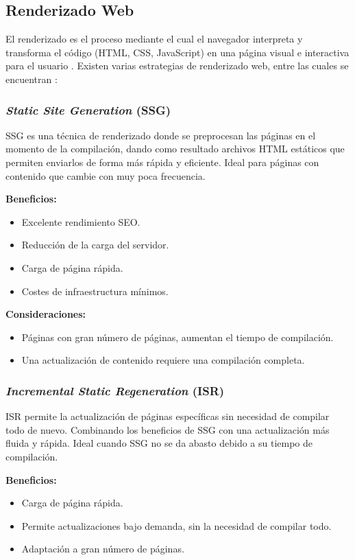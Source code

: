\subsection{Renderizado Web}
El \gls{renderizado} es el proceso mediante el cual el navegador interpreta y transforma el código (HTML, CSS, JavaScript) 
en una página visual e interactiva para el usuario \cite{vercel2024renderingStrategy}.
Existen varias estrategias de renderizado web, entre las cuales se encuentran :

\subsubsection{\textit{Static Site Generation} (SSG)}
SSG es una técnica de renderizado donde se preprocesan las páginas en el momento de la compilación, dando como resultado archivos
HTML estáticos que permiten enviarlos de forma más rápida y eficiente. Ideal para páginas con contenido que cambie con muy poca 
frecuencia. 

\textbf{Beneficios:}
\begin{itemize}
    \item Excelente rendimiento SEO.
    \item Reducción de la carga del servidor.
    \item Carga de página rápida.
    \item Costes de infraestructura mínimos.
\end{itemize}

\textbf{Consideraciones:}
\begin{itemize}
    \item Páginas con gran número de páginas, aumentan el tiempo de compilación.
    \item Una actualización de contenido requiere una compilación completa.
\end{itemize}

\subsubsection{\textit{Incremental Static Regeneration} (ISR)}
ISR permite la actualización de páginas específicas sin necesidad de compilar todo de nuevo. Combinando los beneficios de SSG con
una actualización más fluida y rápida. Ideal cuando SSG no se da abasto debido a su tiempo de compilación.

\textbf{Beneficios:}
\begin{itemize}
    \item Carga de página rápida.
    \item Permite actualizaciones bajo demanda, sin la necesidad de compilar todo.
    \item Adaptación a gran número de páginas.
\end{itemize}

